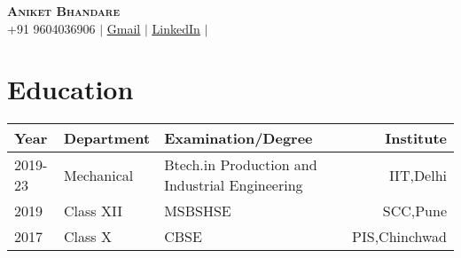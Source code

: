 \documentclass[letterpaper,11pt]{article}
\begin{document}
\begin{center}
    \textbf{\Large \scshape Aniket Bhandare } \\ \vspace{5pt}
    \small+91 9604036906 $|$ \href{mailto:avbhandare.iitd@gmail.com}{\underline{Gmail}} $|$ 
    \href{https://linkedin.com/in/aditya-kumar-inductor}{\underline{LinkedIn}} $|$
    
\end{center}



\section{Education}\vspace{-3mm}

    \begin{table}[h!]
      \begin{center}
        \begin{tabular}{p{}p{}p{}r{}} %
          \toprule
          \textbf{Year} & \textbf{Department} & \textbf{Examination/Degree}& \textbf{Institute }\\ \midrule
         
          2019-23 & Mechanical & Btech.in Production and Industrial Engineering & IIT,Delhi\\
          2019  & Class XII  & MSBSHSE & SCC,Pune\\
          2017 & Class X    & CBSE   & PIS,Chinchwad \\ \bottomrule
        \end{tabular}
      \end{center}
    \end{table}\vspace{-8mm}

\end{document}
